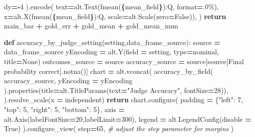\documentclass[
]{article}
\newenvironment{Shaded}{\begin{snugshade}}{\end{snugshade}}
\newcommand{\BuiltInTok}[1]{#1}
\newcommand{\CommentTok}[1]{\textcolor[rgb]{0.56,0.35,0.01}{\textit{#1}}}
\newcommand{\ControlFlowTok}[1]{\textcolor[rgb]{0.13,0.29,0.53}{\textbf{#1}}}
\newcommand{\DecValTok}[1]{\textcolor[rgb]{0.00,0.00,0.81}{#1}}
\newcommand{\KeywordTok}[1]{\textcolor[rgb]{0.13,0.29,0.53}{\textbf{#1}}}
\newcommand{\NormalTok}[1]{#1}
\newcommand{\OperatorTok}[1]{\textcolor[rgb]{0.81,0.36,0.00}{\textbf{#1}}}
\newcommand{\SpecialCharTok}[1]{\textcolor[rgb]{0.81,0.36,0.00}{\textbf{#1}}}
\newcommand{\SpecialStringTok}[1]{\textcolor[rgb]{0.31,0.60,0.02}{#1}}
\newcommand{\StringTok}[1]{\textcolor[rgb]{0.31,0.60,0.02}{#1}}
\newcommand{\VariableTok}[1]{\textcolor[rgb]{0.00,0.00,0.00}{#1}}
\begin{document}
\begin{Shaded}
\begin{Highlighting}[]
\NormalTok{        dy}\OperatorTok{={-}}\DecValTok{4}
\NormalTok{    ).encode(}
\NormalTok{        text}\OperatorTok{=}\NormalTok{alt.Text(}\SpecialStringTok{f\textquotesingle{}mean(}\SpecialCharTok{\{}\NormalTok{mean\_field}\SpecialCharTok{\}}\SpecialStringTok{):Q\textquotesingle{}}\NormalTok{, }\BuiltInTok{format}\OperatorTok{=}\StringTok{\textquotesingle{}.0\%\textquotesingle{}}\NormalTok{),}
\NormalTok{        x}\OperatorTok{=}\NormalTok{alt.X(}\SpecialStringTok{f\textquotesingle{}mean(}\SpecialCharTok{\{}\NormalTok{mean\_field}\SpecialCharTok{\}}\SpecialStringTok{):Q\textquotesingle{}}\NormalTok{,}
\NormalTok{            scale}\OperatorTok{=}\NormalTok{alt.Scale(zero}\OperatorTok{=}\VariableTok{False}\NormalTok{)),}
\NormalTok{    )}
    \ControlFlowTok{return}\NormalTok{ main\_bar }\OperatorTok{+}\NormalTok{ gold\_err }\OperatorTok{+}\NormalTok{ gold\_mean }\OperatorTok{+}\NormalTok{ gold\_mean\_num}

\KeywordTok{def}\NormalTok{ accuracy\_by\_judge\_setting(setting,data\_frame\_source):}
\NormalTok{    source }\OperatorTok{=}\NormalTok{ data\_frame\_source}
\NormalTok{    yEncoding }\OperatorTok{=}\NormalTok{ alt.Y(field }\OperatorTok{=}\NormalTok{ setting, }\BuiltInTok{type}\OperatorTok{=}\StringTok{\textquotesingle{}nominal\textquotesingle{}}\NormalTok{, title}\OperatorTok{=}\VariableTok{None}\NormalTok{)}
\NormalTok{    outcomes\_source }\OperatorTok{=}\NormalTok{ source}
\NormalTok{    accuracy\_source }\OperatorTok{=}\NormalTok{ source[source[}\StringTok{\textquotesingle{}Final probability correct\textquotesingle{}}\NormalTok{].notna()]}
\NormalTok{    chart }\OperatorTok{=}\NormalTok{ alt.vconcat(}
\NormalTok{        accuracy\_by\_field(}
\NormalTok{            accuracy\_source,}
\NormalTok{            yEncoding }\OperatorTok{=}\NormalTok{ yEncoding}
\NormalTok{        ).properties(title}\OperatorTok{=}\NormalTok{alt.TitleParams(text}\OperatorTok{=}\StringTok{"Judge Accuracy"}\NormalTok{, fontSize}\OperatorTok{=}\DecValTok{28}\NormalTok{)),}
\NormalTok{    ).resolve\_scale(x }\OperatorTok{=} \StringTok{\textquotesingle{}independent\textquotesingle{}}\NormalTok{)}
    \ControlFlowTok{return}\NormalTok{ chart.configure(}
\NormalTok{            padding }\OperatorTok{=}\NormalTok{ \{}\StringTok{"left"}\NormalTok{: }\DecValTok{7}\NormalTok{, }\StringTok{"top"}\NormalTok{: }\DecValTok{5}\NormalTok{, }\StringTok{"right"}\NormalTok{: }\DecValTok{5}\NormalTok{, }\StringTok{"bottom"}\NormalTok{: }\DecValTok{5}\NormalTok{\},}
\NormalTok{            axis }\OperatorTok{=}\NormalTok{ alt.Axis(labelFontSize}\OperatorTok{=}\DecValTok{20}\NormalTok{,labelLimit}\OperatorTok{=}\DecValTok{300}\NormalTok{),}
\NormalTok{            legend }\OperatorTok{=}\NormalTok{ alt.LegendConfig(disable }\OperatorTok{=} \VariableTok{True}\NormalTok{)}
\NormalTok{            ).configure\_view(}
\NormalTok{        step}\OperatorTok{=}\DecValTok{65}\NormalTok{,  }\CommentTok{\# adjust the step parameter for margins}
\NormalTok{        )}


\end{Highlighting}
\end{Shaded}
\end{document}
